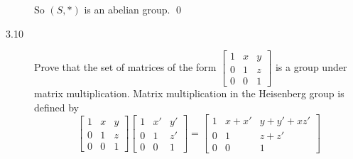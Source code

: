 \documentclass{article}
\begin{document}
\begin{description}
\begin{description}
		\end{description}
		So $(S,\ast)$ is an abelian group. \qed 
		\item[3.10] Prove that the set of matrices of the form $\left[\begin{smallmatrix}
			1	&x	&y\\
			0	&1	&z\\
			0	&0	&1
		\end{smallmatrix}\right]$ is a group under matrix multiplication. Matrix multiplication in the Heisenberg group is defined by \[
		\begin{bmatrix}
		1&  x&  y\\ 
		0&  1&  z\\ 
		0&  0&  1
		\end{bmatrix}
		\begin{bmatrix}
		1&  x'&  y'\\ 
		0&  1&  z'\\ 
		0&  0&  1
		\end{bmatrix} 
		=
		\begin{bmatrix}
		1&  x+x'&  y+y'+xz'\\ 
		0&  1&  z+z'\\ 
		0&  0&  1
		\end{bmatrix}  
		\]
		

\end{description}
\end{document}
